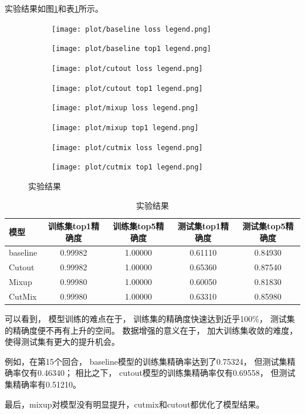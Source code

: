 \documentclass{article}
\begin{document}
实验结果如图\ref{fig:DAresult}和表\ref{table:DAresult}所示。

\begin{figure}[h]
\begin{subfigure}{0.5\textwidth}
\texttt{[image: plot/baseline loss legend.png]}
\end{subfigure}
\begin{subfigure}{0.5\textwidth}
\texttt{[image: plot/baseline top1 legend.png]}
\end{subfigure}
\begin{subfigure}{0.5\textwidth}
\texttt{[image: plot/cutout loss legend.png]}
\end{subfigure}
\begin{subfigure}{0.5\textwidth}
\texttt{[image: plot/cutout top1 legend.png]}
\end{subfigure}
\begin{subfigure}{0.5\textwidth}
\texttt{[image: plot/mixup loss legend.png]}
\end{subfigure}
\begin{subfigure}{0.5\textwidth}
\texttt{[image: plot/mixup top1 legend.png]}
\end{subfigure}
\begin{subfigure}{0.5\textwidth}
\texttt{[image: plot/cutmix loss legend.png]}
\end{subfigure}
\begin{subfigure}{0.5\textwidth}
\texttt{[image: plot/cutmix top1 legend.png]}
\end{subfigure}
\caption{实验结果}
\label{fig:DAresult}
\end{figure}

\begin{table}[h]
\centering
\begin{tabular}{|l|c|c|c|c|} 
\hline
模型 
& 训练集top1精确度 & 训练集top5精确度 
& 测试集top1精确度 & 测试集top5精确度\\
\hline
baseline & 0.99982 & 1.00000 & 0.61110 & 0.84930 \\
Cutout   & 0.99982 & 1.00000 & 0.65360 & 0.87540 \\
Mixup    & 0.99980 & 1.00000 & 0.60050 & 0.81830 \\
CutMix   & 0.99980 & 1.00000 & 0.63310 & 0.85980 \\
\hline
\end{tabular}
\caption{实验结果}
\label{table:DAresult}
\end{table}

可以看到，
模型训练的难点在于，
训练集的精确度快速达到近乎100\%，
测试集的精确度便不再有上升的空间。
数据增强的意义在于，
加大训练集收敛的难度，
使得测试集有更大的提升机会。

例如，在第15个回合，
baseline模型的训练集精确率达到了0.75324，
但测试集精确率仅有0.46340；
相比之下，
cutout模型的训练集精确率仅有0.69558，
但测试集精确率有0.51210。

最后，mixup对模型没有明显提升，cutmix和cutout都优化了模型结果。
\end{document}
